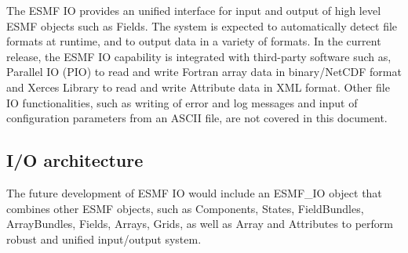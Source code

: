 

The ESMF IO provides an unified interface for input and output of
high level ESMF objects such as Fields.  The system is expected to
automatically detect file formats at runtime, and to output data in 
a variety of formats. In the current release, the ESMF IO capability
is integrated with third-party software such as, Parallel IO (PIO)
to read and write Fortran array data in binary/NetCDF format and Xerces
Library to read and write Attribute data in XML format.  Other file IO
functionalities, such as writing of error and log messages and input of
configuration parameters from an ASCII file, are not covered in this
document.


\subsection{I/O architecture}

The future development of ESMF IO would include an ESMF_IO object that
combines other ESMF objects, such as Components, States, FieldBundles,
ArrayBundles, Fields, Arrays, Grids, as well as Array and Attributes to 
perform robust and unified input/output system.



